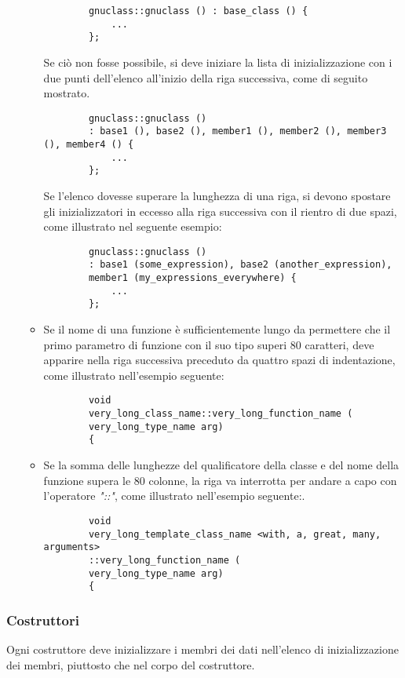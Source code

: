 \documentclass[../NomeDocumento.tex]{subfiles}
\begin{document}
\begin{itemize}
\begin{itemize}
		\begin{verbatim}
		gnuclass::gnuclass () : base_class () { 
			...
		};
		\end{verbatim}
		
		Se ciò non fosse possibile, si deve iniziare la lista di inizializzazione con i due punti dell'elenco all'inizio della riga successiva, come di seguito mostrato.
		
		\begin{verbatim}
		gnuclass::gnuclass ()
		: base1 (), base2 (), member1 (), member2 (), member3 (), member4 () { 
			...
		};
		\end{verbatim}
		
		Se l'elenco dovesse superare la lunghezza di una riga, si devono spostare gli inizializzatori in eccesso alla riga successiva con il rientro di due spazi, come illustrato nel seguente esempio:
		
		\begin{verbatim}
		gnuclass::gnuclass ()
		: base1 (some_expression), base2 (another_expression),
		member1 (my_expressions_everywhere) { 
			...
		};
		\end{verbatim}
		
		\item Se il nome di una funzione è sufficientemente lungo da permettere che il primo parametro di funzione con il suo tipo superi 80 caratteri, deve apparire nella riga successiva preceduto da quattro spazi di indentazione, come illustrato nell'esempio seguente:
		
		\begin{verbatim}
		void
		very_long_class_name::very_long_function_name (
		very_long_type_name arg)
		{
		\end{verbatim}
		
		\item Se la somma delle lunghezze del qualificatore della classe e del nome della funzione supera le 80 colonne, la riga va interrotta per andare a capo con l'operatore \textit{"::"}, come illustrato nell'esempio seguente:.
		
		\begin{verbatim}
		void
		very_long_template_class_name <with, a, great, many, arguments>
		::very_long_function_name (
		very_long_type_name arg)
		{
		\end{verbatim}		
	\end{itemize}
	
	\end{itemize}
	
	\subsubsection{Costruttori} 
	Ogni costruttore deve inizializzare i membri dei dati nell'elenco di inizializzazione dei membri, piuttosto che nel corpo del costruttore.
		
\end{document}

